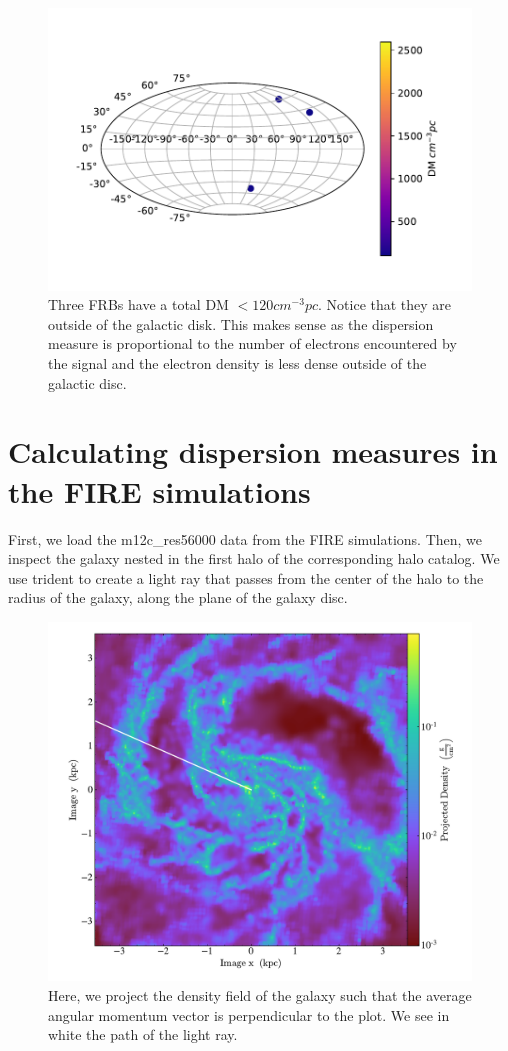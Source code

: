 \documentclass{article}
\begin{document}
\begin{figure}[h]
\begin{center}
  \includegraphics[width = 0.4\columnwidth]{FRB_gal_low_DM.pdf}
\caption{Three FRBs have a total DM $<120 cm^{-3}pc$. Notice that they are outside of the galactic disk. This makes sense as the dispersion measure is proportional to the number of electrons encountered by the signal and the electron density is less dense outside of the galactic disc.}
\end{center}
\end{figure}

\section{Calculating dispersion measures in the FIRE simulations}
First, we load the m12c\_res56000 data from the FIRE simulations. Then, we inspect the galaxy nested in the first halo of the corresponding halo catalog. We use trident to create a light ray that passes from the center of the halo to the radius of the galaxy, along the plane of the galaxy disc.

\begin{figure}[h]
\begin{center}
  \includegraphics[width = 0.4\columnwidth]{ray_parr_galaxy.pdf}
\caption{Here, we project the density field of the galaxy such that the average angular momentum vector is perpendicular to the plot. We see in white the path of the light ray.}
\label{galaxydisc}
\end{center}
\end{figure}
\end{document}
